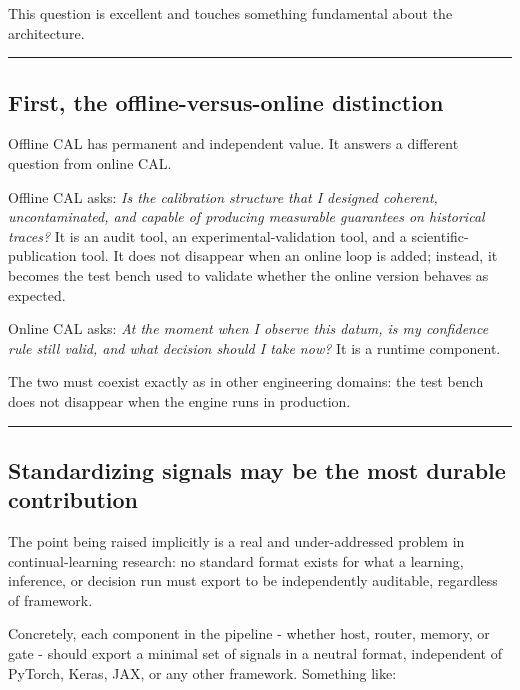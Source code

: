 This question is excellent and touches something fundamental about the architecture.

\begin{center}\rule{0.5\linewidth}{0.5pt}\end{center}

\subsection{First, the offline-versus-online distinction}\label{first-the-offline-versus-online-distinction}

Offline CAL has permanent and independent value. It answers a different question from online CAL.

Offline CAL asks: \emph{Is the calibration structure that I designed coherent, uncontaminated, and capable of producing measurable guarantees on historical traces?} It is an audit tool, an experimental-validation tool, and a scientific-publication tool. It does not disappear when an online loop is added; instead, it becomes the test bench used to validate whether the online version behaves as expected.

Online CAL asks: \emph{At the moment when I observe this datum, is my confidence rule still valid, and what decision should I take now?} It is a runtime component.

The two must coexist exactly as in other engineering domains: the test bench does not disappear when the engine runs in production.

\begin{center}\rule{0.5\linewidth}{0.5pt}\end{center}

\subsection{Standardizing signals may be the most durable contribution}\label{standardizing-signals-may-be-the-most-durable-contribution}

The point being raised implicitly is a real and under-addressed problem in continual-learning research: no standard format exists for what a learning, inference, or decision run must export to be independently auditable, regardless of framework.

Concretely, each component in the pipeline - whether host, router, memory, or gate - should export a minimal set of signals in a neutral format, independent of PyTorch, Keras, JAX, or any other framework. Something like:

